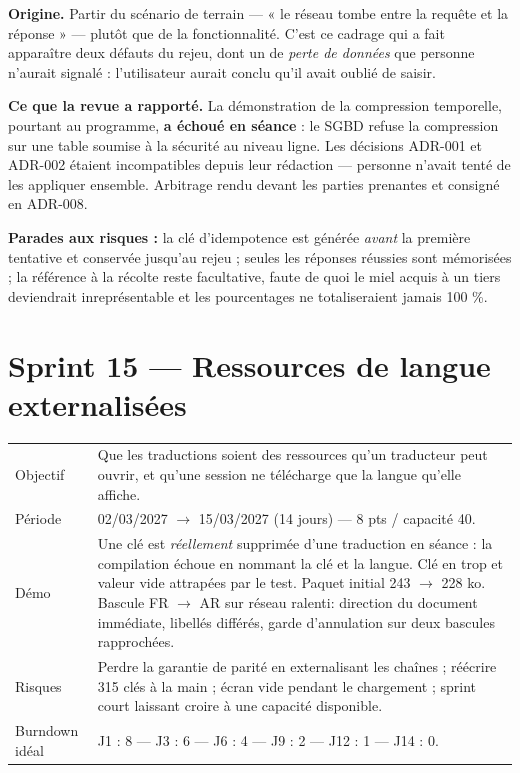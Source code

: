 \textbf{Origine.} Partir du scénario de terrain --- « le réseau tombe entre la
requête et la réponse » --- plutôt que de la fonctionnalité. C'est ce cadrage
qui a fait apparaître deux défauts du rejeu, dont un de \emph{perte de données}
que personne n'aurait signalé : l'utilisateur aurait conclu qu'il avait oublié
de saisir.

\textbf{Ce que la revue a rapporté.} La démonstration de la compression
temporelle, pourtant au programme, \textbf{a échoué en séance} : le SGBD refuse
la compression sur une table soumise à la sécurité au niveau ligne. Les
décisions ADR-001 et ADR-002 étaient incompatibles depuis leur rédaction ---
personne n'avait tenté de les appliquer ensemble. Arbitrage rendu devant les
parties prenantes et consigné en ADR-008.

\textbf{Parades aux risques :} la clé d'idempotence est générée \emph{avant} la
première tentative et conservée jusqu'au rejeu ; seules les réponses réussies
sont mémorisées ; la référence à la récolte reste facultative, faute de quoi le
miel acquis à un tiers deviendrait inreprésentable et les pourcentages ne
totaliseraient jamais 100 \%.

\section{Sprint 15 --- Ressources de langue externalisées}

\begin{center}
\begin{tabular}{lp{11cm}}
\toprule
Objectif  & Que les traductions soient des ressources qu'un traducteur peut
            ouvrir, et qu'une session ne télécharge que la langue qu'elle
            affiche. \\
Période   & 02/03/2027 $\rightarrow$ 15/03/2027 (14 jours) --- 8 pts / capacité 40. \\
Démo      & Une clé est \emph{réellement} supprimée d'une traduction en séance :
            la compilation échoue en nommant la clé et la langue. Clé en trop et
            valeur vide attrapées par le test. Paquet initial 243
            $\rightarrow$ 228 ko. Bascule FR $\rightarrow$ AR sur réseau ralenti:
            direction du document immédiate, libellés différés, garde
            d'annulation sur deux bascules rapprochées. \\
Risques   & Perdre la garantie de parité en externalisant les chaînes ;
            réécrire 315 clés à la main ; écran vide pendant le chargement ;
            sprint court laissant croire à une capacité disponible. \\
Burndown idéal & J1 : 8 --- J3 : 6 --- J6 : 4 --- J9 : 2 --- J12 : 1 --- J14 : 0. \\
\bottomrule
\end{tabular}
\end{center}


